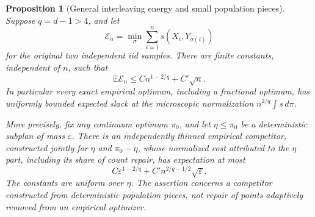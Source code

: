 \documentclass[11pt,reqno]{amsart}
\newtheorem{proposition}[theorem]{Proposition}
\theoremstyle{definition}
\theoremstyle{remark}
\numberwithin{equation}{section}
\newcommand{\E}{\mathbb E}
\begin{document}
\begin{proposition}[General interleaving energy and small population pieces]
\label{prop:general-upper-energy}
Suppose \(q=d-1>4\), and let
\[
 \mathcal E_n=\min_\sigma\sum_{i=1}^n s(X_i,Y_{\sigma(i)})
\]
for the original two independent iid samples. There are finite
constants, independent of \(n\), such that
\begin{equation}
\label{eq:general-upper-global-energy}
 \E\mathcal E_n\le Cn^{1-2/q}+C'\sqrt n.
\end{equation}
In particular every exact empirical optimum, including a fractional
optimum, has uniformly bounded expected slack at the microscopic
normalization \(n^{2/q}\int s\,d\pi\).

More precisely, fix any continuum optimum \(\pi_0\), and let
\(\eta\le\pi_0\) be a deterministic subplan of mass \(\varepsilon\).
There is an independently thinned empirical competitor, constructed
jointly for \(\eta\) and \(\pi_0-\eta\), whose normalized cost
attributed to the \(\eta\) part, including its share of count repair,
has expectation at most
\begin{equation}
\label{eq:general-upper-small-mass}
 C\varepsilon^{1-2/q}
       +C'n^{2/q-1/2}\sqrt\varepsilon.
\end{equation}
The constants are uniform over \(\eta\). The assertion concerns a
competitor constructed from deterministic population pieces, not
repair of points adaptively removed from an empirical optimizer.
\end{proposition}
\end{document}
